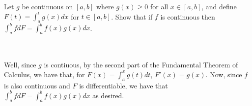Let $g$ be continuous on $[a,b]$ where $g(x)\geq0$ for all $x\in[a,b]$, and define
$F(t)=\int_a^tg(x)dx$ for $t\in[a,b]$. Show that if $f$ is continuous then
$\int_a^bfdF=\int_a^bf(x)g(x)dx$.\\\\

\begin{solution}\renewcommand{\qedsymbol}{}\ \\
    Well, since $g$ is contiuous, by the second part of the Fundamental Theorem of Calculus, we have
    that, for $F(x)=\int_a^xg(t)dt$, $F'(x)=g(x)$. Now, since $f$ is also continuous and $F$ is
    differentiable, we have that $\int_a^bfdF=\int_a^bf(x)g(x)dx$ as desired.

\end{solution}